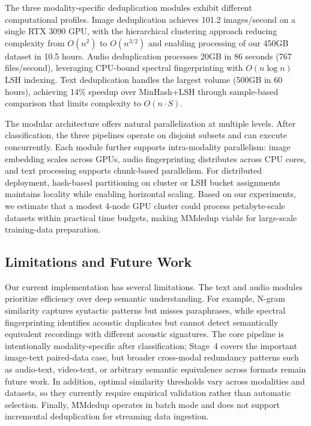 \documentclass[conference]{IEEEtran}
\begin{document}
The three modality-specific deduplication modules exhibit different computational profiles. Image deduplication achieves 101.2 images/second on a single RTX 3090 GPU, with the hierarchical clustering approach reducing complexity from $O(n^2)$ to $O(n^{3/2})$ and enabling processing of our 450GB dataset in 10.5 hours. Audio deduplication processes 20GB in 86 seconds (767 files/second), leveraging CPU-bound spectral fingerprinting with $O(n \log n)$ LSH indexing. Text deduplication handles the largest volume (500GB in 60 hours), achieving 14\% speedup over MinHash+LSH through sample-based comparison that limits complexity to $O(n \cdot S)$.

The modular architecture offers natural parallelization at multiple levels. After classification, the three pipelines operate on disjoint subsets and can execute concurrently. Each module further supports intra-modality parallelism: image embedding scales across GPUs, audio fingerprinting distributes across CPU cores, and text processing supports chunk-based parallelism. For distributed deployment, hash-based partitioning on cluster or LSH bucket assignments maintains locality while enabling horizontal scaling. Based on our experiments, we estimate that a modest 4-node GPU cluster could process petabyte-scale datasets within practical time budgets, making MMdedup viable for large-scale training-data preparation.

\subsection{Limitations and Future Work}
Our current implementation has several limitations. The text and audio modules prioritize efficiency over deep semantic understanding. For example, N-gram similarity captures syntactic patterns but misses paraphrases, while spectral fingerprinting identifies acoustic duplicates but cannot detect semantically equivalent recordings with different acoustic signatures. The core pipeline is intentionally modality-specific after classification; Stage~4 covers the important image-text paired-data case, but broader cross-modal redundancy patterns such as audio-text, video-text, or arbitrary semantic equivalence across formats remain future work. In addition, optimal similarity thresholds vary across modalities and datasets, so they currently require empirical validation rather than automatic selection. Finally, MMdedup operates in batch mode and does not support incremental deduplication for streaming data ingestion.
\end{document}
